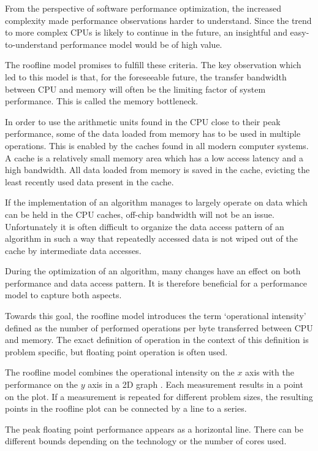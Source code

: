 \documentclass[a4paper,12pt]{report}
\newlength{\imgwidth}
\newlength{\imgleftoverhang}
\newcommand{\graphNoVskip}[1]
{
	\settowidth{\imgwidth}{\texttt{[image: graphs/\#1.pdf]}}
	\setlength{\imgleftoverhang}{0.1\textwidth}
	\setlength{\imgwidth}{1.205\textwidth}
	\hfuzz50pt
	\noindent\hskip-\imgleftoverhang
	\hskip-0.25in\texttt{[image: graphs/\#1.pdf]}
	\hfuzz0.1pt
}
\newcommand{\graphFloat}[2]
{
\begin{figure}[htbp]
\graphNoVskip{#1}
\vskip-0.5cm
\caption{#2}
\label{#1}
\end{figure}
}
\begin{document}
From the perspective of software performance optimization, the increased
complexity made performance observations harder to understand. Since the trend
to more complex CPUs is likely to continue in the future, an insightful and
easy-to-understand performance model would be of high value.
 
The roofline model \cite{Roofline} promises to fulfill these criteria. The key
observation which led to this model is that, for the foreseeable future, the
transfer bandwidth between CPU and memory will often be the limiting factor of
system performance. This is called the memory bottleneck.

In order to use the arithmetic units found in the CPU close to their peak
performance, some of the data loaded from memory has to be used in multiple
operations. This is enabled by the caches found in all modern computer
systems. A cache is a relatively small memory area which has a low access
latency and a high bandwidth. All data loaded from memory is saved in the cache,
evicting the least recently used data present in the cache. 

If the implementation of an algorithm manages to largely operate on data which
can be held in the CPU caches, off-chip bandwidth will not be an issue. 
Unfortunately it is often difficult to organize the data access
pattern of an algorithm in such a way that repeatedly accessed data is not
wiped out of the cache by intermediate data accesses.

During the optimization of an algorithm, many changes have an effect on both
performance and data access pattern. It is therefore beneficial for a
performance model to capture both aspects.

Towards this goal, the roofline model introduces the term `operational
intensity' defined as the number of performed operations per byte transferred
between CPU and memory. The exact definition of operation in the context of
this definition is problem specific, but floating point operation is often used.


The roofline model combines the operational intensity on the $x$ axis with the
performance on the $y$ axis in a 2D graph . Each
measurement results in a point on the plot. If a measurement is repeated
for different problem sizes, the resulting points in the roofline plot
can be connected by a line to a series.

The peak floating point performance appears as a horizontal line. There can be
different bounds depending on the technology or the number of cores used. 
\end{document}
